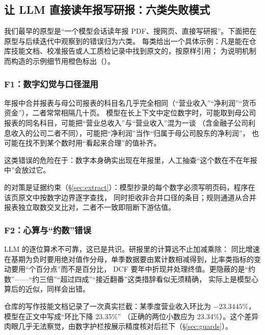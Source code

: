 \subsection{让 LLM 直接读年报写研报：六类失败模式}
\label{sec:intro-failures}

我们最早的原型是“一个模型会话读年报 PDF、搜网页、直接写研报”。下面把在原型与后续迭代中观察到的错误归为六类。
每类给出一个具体示例：凡是能在仓库技能文档、校准报告或人工质检记录中找到原文的，按原样引用；
为说明机制而构造的示例细节用橙色标出（）。

\subsubsection{F1：数字幻觉与口径混用}
年报中合并报表与母公司报表的科目名几乎完全相同（“营业收入”“净利润”“货币资金”），二者常常相隔几十页。
模型在长上下文中定位数字时，可能取到母公司报表的同名科目，可能把“营业总收入”与“营业收入”混为一谈
（含金融子公司利息收入的公司二者不同），可能把“净利润”当作“归属于母公司股东的净利润”，
也可能在找不到某个数时用“看起来合理”的值补齐。

\begin{failcase}[：取到母公司报表]
这类错误的危险在于：数字本身确实出现在年报里，人工抽查“这个数在不在年报中”会放过它。
\end{failcase}

\sysname{} 的对策是证据约束（\S\ref{sec:extract}）：模型抄录的每个数字必须写明页码，程序在该页原文中按数字边界逐字查找，
同时拒收非合并口径的条目；规则通道从合并报表独立取数交叉比对，二者不一致即阻断下游估值。

\subsubsection{F2：心算与“约数”错误}
LLM 的逐位算术不可靠，这已是共识\cite{gao2023pal,chen2023pot}。研报里的计算远不止加减乘除：
同比增速在基期为负时要用绝对值作分母，单季数据要由累计数相减得到，比率类指标的变动要用“个百分点”而不是百分比，
DCF 要年中折现并处理终值。更隐蔽的是“约数”——“约三倍”“超过四成”“接近翻番”这类措辞看似无须精确，
实际上是模型心算后的近似，同样会出错。

\begin{failcase}[：环比心算取整]
仓库的写作技能文档记录了一次真实拦截：某季度营业收入环比为 $-23.3445\%$，模型在正文中写成“环比下降 23.35\%”
（正确的两位小数应为 23.34\%）。这个差异肉眼几乎无法察觉，由数字护栏按展示精度核对后拦下（\S\ref{sec:guards}）。
\end{failcase}


